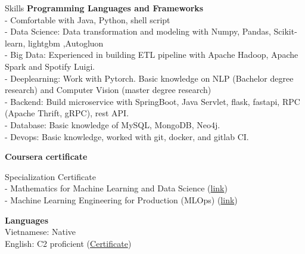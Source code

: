 \documentclass{resume} %
\begin{document}
\begin{rSection}{Skills}
{\bf Programming Languages and Frameworks }
\\ - Comfortable with Java, Python, shell script
\\ - Data Science: Data transformation and modeling with Numpy, Pandas, Scikit-learn, lightgbm ,Autogluon
\\ - Big Data: Experienced in building ETL pipeline with Apache Hadoop, Apache Spark and Spotify Luigi.
\\ - Deeplearning: Work with Pytorch. Basic knowledge on NLP (Bachelor degree research) and Computer Vision (master degree research)
\\ - Backend: Build microservice with SpringBoot, Java Servlet, flask, fastapi, RPC (Apache Thrift, gRPC), rest API. 
\\ - Database: Basic knowledge of MySQL, MongoDB, Neo4j. 
\\ - Devops: Basic knowledge, worked with git, docker, and gitlab CI.

\newpage

{\bf Coursera certificate }

Specialization Certificate 
\\ - Mathematics for Machine Learning and Data Science (\href{https://coursera.org/share/ae3f40effbceedf3488075d566a95551}{link})
\\ - Machine Learning Engineering for Production (MLOps) (\href{https://coursera.org/share/ce5ec378a0075b8ffdbd5b235f8a84bd}{link})


{\bf Languages}
\\Vietnamese: Native
\\English: C2 proficient (\href{https://www.efset.org/cert/o5HAWP}{Certificate})
\end{rSection}




\end{document}
